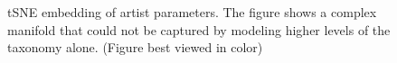 
\begin{figure}[h]
	\caption{tSNE embedding of artist parameters. The figure shows a complex manifold that could not be captured by modeling higher levels of the taxonomy alone. (Figure best viewed in color)}
	\label{tSNEfig}
\end{figure}
